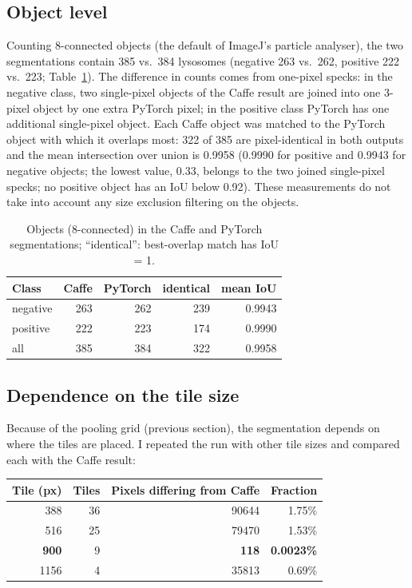 \documentclass[11pt,a4paper]{article}
\begin{document}
\subsection{Object level}
Counting 8-connected objects (the default of ImageJ's particle analyser), the two segmentations contain 385 vs.\ 384 lysosomes (negative 263 vs.\ 262, positive 222 vs.\ 223; Table~\ref{tab:obj}). The difference in counts comes from one-pixel specks: in the negative class, two single-pixel objects of the Caffe result are joined into one 3-pixel object by one extra PyTorch pixel; in the positive class PyTorch has one additional single-pixel object. Each Caffe object was matched to the PyTorch object with which it overlaps most: 322 of 385 are pixel-identical in both outputs and the mean intersection over union is 0.9958 (0.9990 for positive and 0.9943 for negative objects; the lowest value, 0.33, belongs to the two joined single-pixel specks; no positive object has an IoU below 0.92). These measurements do not take into account any size exclusion filtering on the objects.

\begin{table}[h]\centering
\caption{Objects (8-connected) in the Caffe and PyTorch segmentations; ``identical'': best-overlap match has IoU = 1.}\label{tab:obj}
\begin{tabular}{lrrrr}\toprule
Class & Caffe & PyTorch & identical & mean IoU\\\midrule
negative & 263 & 262 & 239 & 0.9943\\
positive & 222 & 223 & 174 & 0.9990\\
all & 385 & 384 & 322 & 0.9958\\\bottomrule
\end{tabular}
\end{table}

\subsection{Dependence on the tile size}
Because of the pooling grid (previous section), the segmentation depends on where the tiles are placed. I repeated the run with other tile sizes and compared each with the Caffe result:

\begin{center}\begin{tabular}{rrrr}\toprule
Tile (px) & Tiles & Pixels differing from Caffe & Fraction\\\midrule
388 & 36 & \num[scientific-notation=false,round-mode=none]{90644} & 1.75\%\\
516 & 25 & \num[scientific-notation=false,round-mode=none]{79470} & 1.53\%\\
\textbf{900} & 9 & \textbf{118} & \textbf{0.0023\%}\\
1156 & 4 & \num[scientific-notation=false,round-mode=none]{35813} & 0.69\%\\\bottomrule
\end{tabular}\end{center}
\end{document}
